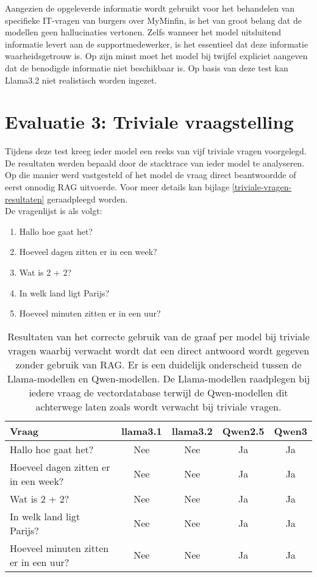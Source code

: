 Aangezien de opgeleverde informatie wordt gebruikt voor het behandelen van specifieke IT-vragen van burgers over MyMinfin, is het van groot belang dat de modellen geen hallucinaties vertonen. Zelfs wanneer het model uitsluitend informatie levert aan de supportmedewerker, is het essentieel dat deze informatie waarheidsgetrouw is. Op zijn minst moet het model bij twijfel expliciet aangeven dat de benodigde informatie niet beschikbaar is. Op basis van deze test kan Llama3.2 niet realistisch worden ingezet.

\section{Evaluatie 3: Triviale vraagstelling}

Tijdens deze test kreeg ieder model een reeks van vijf triviale vragen voorgelegd. De resultaten werden bepaald door de stacktrace van ieder model te analyseren. Op die manier werd vastgesteld of het model de vraag direct beantwoordde of eerst onnodig RAG uitvoerde. Voor meer details kan bijlage \ref{triviale-vragen-resultaten} geraadpleegd worden.
\\[1em]
De vragenlijst is als volgt:

\begin{enumerate}
    \item Hallo hoe gaat het?
    \item Hoeveel dagen zitten er in een week?
    \item Wat is 2 + 2?
    \item In welk land ligt Parijs?
    \item Hoeveel minuten zitten er in een uur?
\end{enumerate}

\begin{table}[H]
    \centering
    \begin{tabular}{|l|c|c|c|c|}
        \hline
        \textbf{Vraag} & \textbf{llama3.1} & \textbf{llama3.2} & \textbf{Qwen2.5} & \textbf{Qwen3} \\
        \hline
        Hallo hoe gaat het? & Nee & Nee & Ja & Ja \\
        Hoeveel dagen zitten er in een week? & Nee & Nee & Ja & Ja \\
        Wat is 2 + 2? & Nee & Nee & Ja & Ja \\
        In welk land ligt Parijs? & Nee & Nee & Ja & Ja \\
        Hoeveel minuten zitten er in een uur? & Nee & Nee & Ja & Ja \\
        \hline
    \end{tabular}
    \caption{Resultaten van het correcte gebruik van de graaf per model bij triviale vragen waarbij verwacht wordt dat een direct antwoord wordt gegeven zonder gebruik van RAG. Er is een duidelijk onderscheid tussen de Llama-modellen en Qwen-modellen. De Llama-modellen raadplegen bij iedere vraag de vectordatabase terwijl de Qwen-modellen dit achterwege laten zoals wordt verwacht bij triviale vragen.}
    
\end{table}


